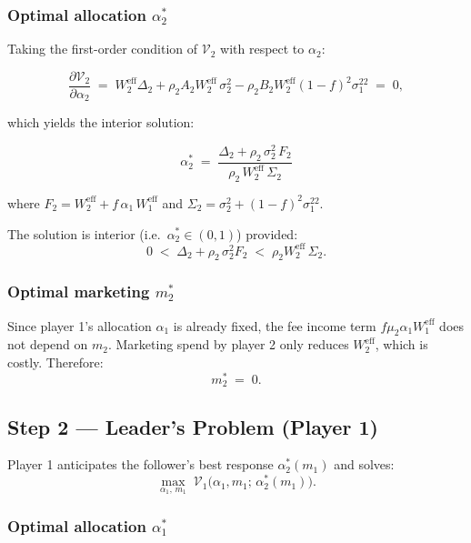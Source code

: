 \documentclass[12pt,a4paper]{article}
\newcommand{\1}{\mathbf{1}}
\begin{document}
\subsubsection{Optimal allocation $\alpha_2^*$}

Taking the first-order condition of $\mathcal{V}_2$ with respect to $\alpha_2$:

\begin{equation}
  \frac{\partial \mathcal{V}_2}{\partial \alpha_2} \;=\;
  W_2^{\mathrm{eff}}\Delta_2
  + \rho_2 A_2 W_2^{\mathrm{eff}}\,\sigma_2^2
  - \rho_2 B_2 W_2^{\mathrm{eff}}(1-f)^2\sigma_1^{22}
  \;=\; 0,
\end{equation}

which yields the interior solution:

\begin{equation}
  \boxed{
    \alpha_2^* \;=\;
    \frac{\Delta_2 + \rho_2\,\sigma_2^2\,F_2}
         {\rho_2\,W_2^{\mathrm{eff}}\,\Sigma_2}
  }
  \label{eq:alpha2_star}
\end{equation}

where $F_2 = W_2^{\mathrm{eff}} + f\,\alpha_1\,W_1^{\mathrm{eff}}$ and $\Sigma_2 = \sigma_2^2 + (1-f)^2\sigma_1^{22}$.

The solution is interior (i.e.\ $\alpha_2^* \in (0,1)$) provided:
\[
  0 \;<\; \Delta_2 + \rho_2\,\sigma_2^2 F_2 \;<\; \rho_2 W_2^{\mathrm{eff}}\,\Sigma_2.
\]

\subsubsection{Optimal marketing $m_2^*$}

Since player 1's allocation $\alpha_1$ is already fixed, the fee income term $f\mu_2\alpha_1 W_1^{\mathrm{eff}}$ does not depend on $m_2$. Marketing spend by player 2 only reduces $W_2^{\mathrm{eff}}$, which is costly. Therefore:
\begin{equation}
  m_2^* \;=\; 0.
  \label{eq:m2_star}
\end{equation}

\subsection{Step 2 — Leader's Problem (Player 1)}

Player 1 anticipates the follower's best response $\alpha_2^*(m_1)$ and solves:
\[
  \max_{\alpha_1,\, m_1} \;\mathcal{V}_1\bigl(\alpha_1, m_1;\, \alpha_2^*(m_1)\bigr).
\]

\subsubsection{Optimal allocation $\alpha_1^*$}
\end{document}
